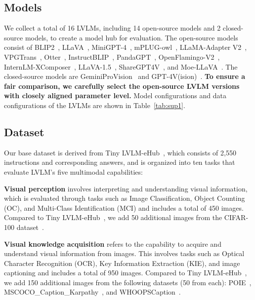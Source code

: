 \subsection{Models}
We collect a total of 16 LVLMs, including 14 open-source models and 2 closed-source models, to create a model hub for evaluation. The open-source models consist of BLIP2~\cite{li2023blip}, LLaVA~\cite{llava}, MiniGPT-4~\cite{zhu2023minigpt}, mPLUG-owl~\cite{ye2023mplug}, LLaMA-Adapter V2~\cite{gao2023llama}, VPGTrans~\cite{zhang2023vpgtrans}, Otter~\cite{li2023otter}, InstructBLIP~\cite{dai2023instructblip}, PandaGPT~\cite{su2023pandagpt}, OpenFlamingo-V2~\cite{openfamingov2}, InternLM-XComposer~\cite{zhang2023internlm}, LLaVA-1.5~\cite{liu2023improved}, ShareGPT4V~\cite{chen2023sharegpt4v}, and Moe-LLaVA~\cite{lin2024moe}. The closed-source models are GeminiProVision~\cite{team2023gemini} and GPT-4V(ision)~\cite{OpenAI2023GPT4TR}.
\textbf{To ensure a fair comparison, we carefully select the open-source LVLM versions with closely aligned parameter level.} Model configurations and data configurations of the LVLMs are shown in Table~\ref{tab:sup1}.

\subsection{Dataset}
Our base dataset is derived from Tiny LVLM-eHub~\cite{shao2023tiny}, which consists of 2,550 instructions and corresponding answers, and is organized into ten tasks that evaluate LVLM's five multimodal capabilities: 

\textbf{Visual perception} involves interpreting and understanding visual information, which is evaluated through tasks such as Image Classification, Object Counting (OC), and Multi-Class Identification (MCI) and includes a total of 450 images. Compared to Tiny LVLM-eHub~\cite{shao2023tiny}, we add 50 additional images from the CIFAR-100 dataset~\cite{Krizhevsky2009LearningML}.

\textbf{Visual knowledge acquisition} refers to the capability to acquire and understand visual information from images. This involves tasks such as Optical Character Recognition (OCR), Key Information Extraction (KIE), and image captioning and includes a total of 950 images. Compared to Tiny LVLM-eHub~\cite{shao2023tiny}, we add 150 additional images from the following datasets (50 from each): POIE~\cite{zheng2018opentag}, MSCOCO\_Caption\_Karpathy~\cite{chen2015microsoft}, and WHOOPSCaption~\cite{bitton2023breakingwhoops}.


